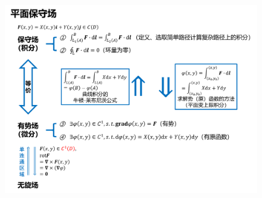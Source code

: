 \documentclass[12pt,UTF8,fleqn]{ctexart}
\begin{document}
\begin{figure}[H]
\begin{center}
\includegraphics[height=0.54\textheight]{Figures25/PlaneConserv.png}
\end{center}
\end{figure}
\end{document}
